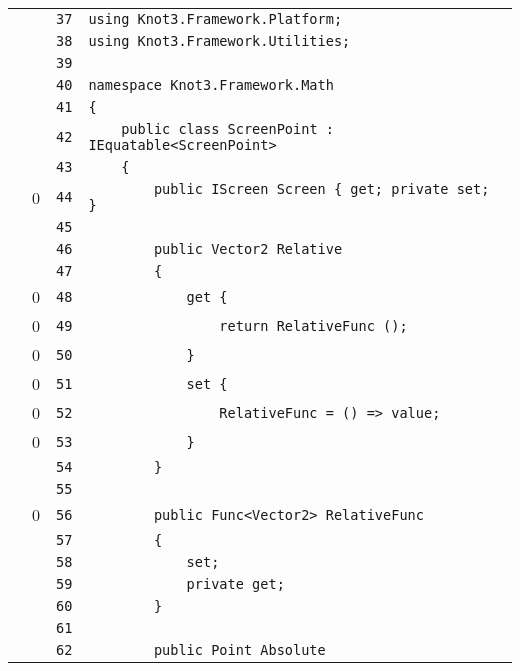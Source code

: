 \documentclass[a4paper,10pt]{article}
\begin{document}
\begin{longtable}[l]{lrrl}
\cellcolor{gray} &  & \verb~37~ & \verb~using Knot3.Framework.Platform;~\\
\cellcolor{gray} &  & \verb~38~ & \verb~using Knot3.Framework.Utilities;~\\
\cellcolor{gray} &  & \verb~39~ & \verb~~\\
\cellcolor{gray} &  & \verb~40~ & \verb~namespace Knot3.Framework.Math~\\
\cellcolor{gray} &  & \verb~41~ & \verb~{~\\
\cellcolor{gray} &  & \verb~42~ & \verb~    public class ScreenPoint : IEquatable<ScreenPoint>~\\
\cellcolor{gray} &  & \verb~43~ & \verb~    {~\\
\cellcolor{red} & 0 & \verb~44~ & \verb~        public IScreen Screen { get; private set; }~\\
\cellcolor{gray} &  & \verb~45~ & \verb~~\\
\cellcolor{gray} &  & \verb~46~ & \verb~        public Vector2 Relative~\\
\cellcolor{gray} &  & \verb~47~ & \verb~        {~\\
\cellcolor{red} & 0 & \verb~48~ & \verb~            get {~\\
\cellcolor{red} & 0 & \verb~49~ & \verb~                return RelativeFunc ();~\\
\cellcolor{red} & 0 & \verb~50~ & \verb~            }~\\
\cellcolor{red} & 0 & \verb~51~ & \verb~            set {~\\
\cellcolor{red} & 0 & \verb~52~ & \verb~                RelativeFunc = () => value;~\\
\cellcolor{red} & 0 & \verb~53~ & \verb~            }~\\
\cellcolor{gray} &  & \verb~54~ & \verb~        }~\\
\cellcolor{gray} &  & \verb~55~ & \verb~~\\
\cellcolor{red} & 0 & \verb~56~ & \verb~        public Func<Vector2> RelativeFunc~\\
\cellcolor{gray} &  & \verb~57~ & \verb~        {~\\
\cellcolor{gray} &  & \verb~58~ & \verb~            set;~\\
\cellcolor{gray} &  & \verb~59~ & \verb~            private get;~\\
\cellcolor{gray} &  & \verb~60~ & \verb~        }~\\
\cellcolor{gray} &  & \verb~61~ & \verb~~\\
\cellcolor{gray} &  & \verb~62~ & \verb~        public Point Absolute~\\

\end{longtable}
\end{document}
